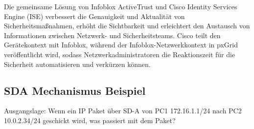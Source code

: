 Die gemeinsame Lösung von Infoblox ActiveTrust und Cisco Identity Services Engine (ISE) verbessert die Genauigkeit und Aktualität von Sicherheitsmaßnahmen, erhöht die Sichtbarkeit und erleichtert den Austausch von Informationen zwischen Netzwerk- und Sicherheitsteams. Cisco teilt den Gerätekontext mit Infoblox, während der Infoblox-Netzwerkkontext in pxGrid veröffentlicht wird, sodass Netzwerkadministratoren die Reaktionszeit für die Sicherheit automatisieren und verkürzen können.\cite{infoblox-communityblog}



\subsection{SDA Mechanismus Beispiel}

Ausgangslage: Wenn ein IP Paket über SD-A von PC1 172.16.1.1/24 nach PC2 10.0.2.34/24 geschickt wird, was passiert mit dem Paket?

